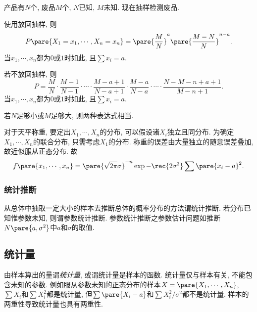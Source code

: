 \documentclass{ctexart}
\begin{document}

\begin{sample}
    \begin{ex}
        产品有$N$个, 废品$M$个, $N$已知, $M$未知. 现在抽样检测废品.
        \begin{cenum}
            \item 使用放回抽样, 则
            \[ P\pare{X_1= x_1,\cdots,X_n = x_n} = \pare{\frac{M}{N}}^a\pare{\frac{M-N}{N}}^{n-a}. \]
            当$x_1,\cdots,x_n$都为$0$或$1$时如此, 且$\sum x_i = a$.
            \item 若不放回抽样, 则
            \[ P = \frac{M}{N}\cdot \frac{M-1}{N-1} \cdot\cdots\cdot \frac{M-a+1}{N-a+1}\cdot \frac{M-a}{N-a}\cdot \cdots  \cdot \frac{N-M-n+a+1}{M-n+1}. \]
            当$x_1,\cdots,x_n$都为$0$或$1$时如此, 且$\sum x_i = a$.
        \end{cenum}
        若$N$足够小或$M$足够大, 则两种表达式相当.
    \end{ex}
\end{sample}
\begin{sample}
    \begin{ex}
        对于天平称重, 要定出$X_1,\cdots,X_n$的分布, 可以假设诸$X_i$独立且同分布. 为确定$X_1,\cdots,X_n$的联合分布, 只需考虑$X_1$的分布. 称重的误差由大量独立的随意误差叠加, 故近似服从正态分布. 故
        \[ f\pare{x_1,\cdots,x_n} = \pare{\sqrt{2\pi}\sigma}^{-n}\exp{-\rec{2\sigma^2}\sum{\pare{x_i-a}^2}}. \]
    \end{ex}
\end{sample}


\subsubsection{统计推断} %
\label{ssub:统计推断}

从总体中抽取一定大小的样本去推断总体的概率分布的方法谓统计推断. 若分布已知惟参数未知, 则谓参数统计推断. 参数统计推断之参数估计问题如推断$N\pare{a,\sigma^2}$中$a$和$\sigma$的取值.



\subsection{统计量} %
\label{sub:统计量}

由样本算出的量谓\emph{统计量}, 或谓统计量是样本的函数. 统计量仅与样本有关, 不能包含未知的参数. 例如服从参数未知的正态分布的样本$X = \pare{X_1,\cdots,X_n}$, $\sum X_i$和$\sum X_i^2$都是统计量, 但$\sum\pare{X_i - a}$和$\sum X_i^2/\sigma^2$都不是统计量. 样本的两重性导致统计量也具有两重性.
\end{document}
